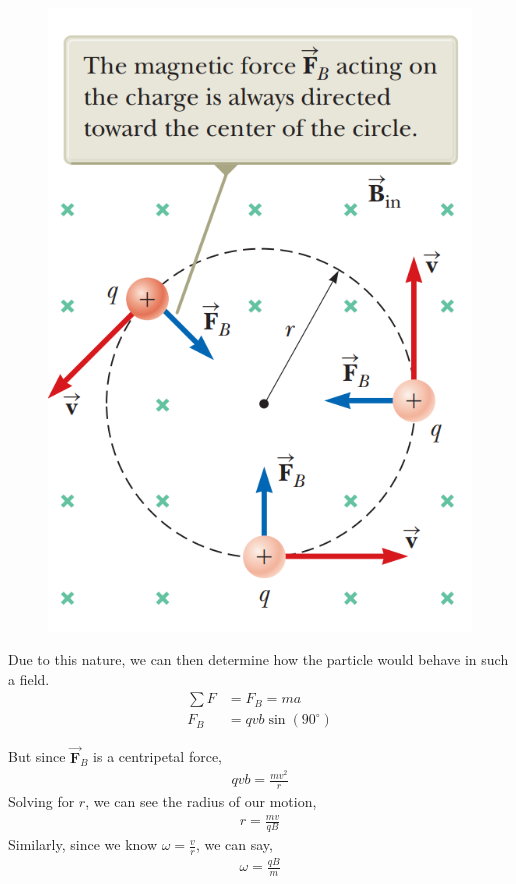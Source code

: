 \documentclass[12pt, titlepage, oneside]{article}
\let\oldvec\vec
\renewcommand{\vec}[1]{\oldvec{\bm{#1}}}
\begin{document}
\begin{figure}
	\vspace{-1cm}
		\includegraphics[scale=0.6]{2.png}
\end{figure}
Due to this nature, we can then determine how the particle would behave in such a field.
\begin{align*}
\sum F &= F_B = ma\\
F_B &= q v b \sin(90^{\circ})
\end{align*}

But since $\vec{F}_B$ is a centripetal force,
\begin{align*}
qvb = \frac{mv^2}{r}
\end{align*}
Solving for $r$, we can see the radius of our motion,
\begin{align*}
r = \frac{mv}{qB}
\end{align*}
Similarly, since we know $\omega = \frac{v}{r}$, we can say,
\begin{align*}
\omega = \frac{qB}{m}
\end{align*}
\\
\end{document}
